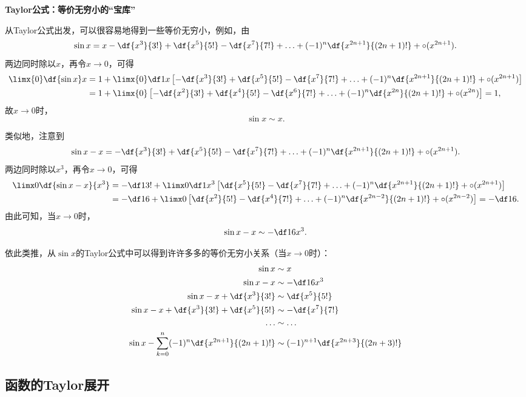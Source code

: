 \begin{shaded}
	{\bf Taylor公式：等价无穷小的“宝库”}
	
	从Taylor公式出发，可以很容易地得到一些等价无穷小，例如，由
	$$\sin x=x-\df{x^3}{3!}+\df{x^5}{5!}-\df{x^7}{7!}+
	\ldots+(-1)^n\df{x^{2n+1}}{(2n+1)!}+\circ(x^{2n+1}).$$
	两边同时除以$x$，再令$x\to 0$，可得
	\begin{align*}
		\limx{0}\df{\sin x}x&=1+\limx{0}\df1x\left[-\df{x^3}{3!}+
		\df{x^5}{5!}-\df{x^7}{7!}+ 
		\ldots+(-1)^n\df{x^{2n+1}}{(2n+1)!}+\circ(x^{2n+1})\right]\\
		&=1+\limx{0}\left[-\df{x^2}{3!}+
		\df{x^4}{5!}-\df{x^6}{7!}+ 
		\ldots+(-1)^n\df{x^{2n}}{(2n+1)!}+\circ(x^{2n})\right]=1,
	\end{align*}
	故$x\to 0$时，
	$$\sin x\sim x.$$
	
	类似地，注意到
	$$\sin x-x=-\df{x^3}{3!}+\df{x^5}{5!}-\df{x^7}{7!}+
	\ldots+(-1)^n\df{x^{2n+1}}{(2n+1)!}+\circ(x^{2n+1}).$$
	两边同时除以$x^3$，再令$x\to 0$，可得
	\begin{align*}
		\limx0\df{\sin x-x}{x^3}
		&=-\df1{3!}+\limx0\df1{x^3}\left[\df{x^5}{5!}-\df{x^7}{7!}+ 
		\ldots+(-1)^n\df{x^{2n+1}}{(2n+1)!}+\circ(x^{2n+1})\right]\\
		&=-\df16+\limx0\left[\df{x^2}{5!}-\df{x^4}{7!}+ 
		\ldots+(-1)^n\df{x^{2n-2}}{(2n+1)!}+\circ(x^{2n-2})\right]
		=-\df16.
	\end{align*}
	由此可知，当$x\to 0$时，
	$$\sin x-x\sim -\df16x^3.$$
	
	依此类推，从$\sin x$的Taylor公式中可以得到许许多多的等价无穷小关系（当$x\to 0$时）：
		\begin{align*}
			\sin x&\sim  x\\
			\sin x-x&\sim  -\df16x^3\\
			\sin x-x+\df{x^3}{3!} & \sim  \df{x^5}{5!}\\
			\sin x-x+\df{x^3}{3!}+\df{x^5}{5!} & \sim  -\df{x^7}{7!}\\
			\ldots & \sim  \ldots\\
			\sin x-\sum\limits_{k=0}^n(-1)^n\df{x^{2n+1}}{(2n+1)!}
			&\sim  (-1)^{n+1}\df{x^{2n+3}}{(2n+3)!}
		\end{align*}
\end{shaded}

\subsection{函数的Taylor展开}

